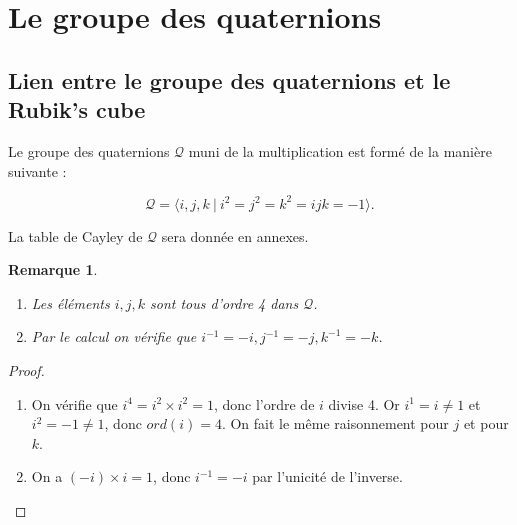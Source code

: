 \documentclass[french]{report}
\newtheorem*{remark}{Remarque}
\begin{document}








\section{Le groupe des quaternions}

\subsection{Lien entre le groupe des quaternions et le Rubik's cube}

Le groupe des quaternions $\mathcal{Q}$ muni de la multiplication est formé de la manière suivante :

$$ \mathcal{Q} = \langle i,j,k \ | \ i ^2 = j ^2 = k ^2 = ijk = -1 \rangle  .$$

La table de Cayley de $\mathcal{Q}$ sera donnée en annexes.

\begin{remark}
  \

  \begin{enumerate}
    \item Les éléments $i,j,k$ sont tous d'ordre 4 dans $\mathcal{Q}$.
    \item Par le calcul on vérifie que $i ^{-1} = -i, j ^{-1} = -j, k ^{-1} = -k$.
  \end{enumerate}
\end{remark}

\begin{proof}
\

\begin{enumerate}
  \item   On vérifie que $i ^{4} = i ^2 \times i ^2 = 1$, donc l'ordre de $i$ divise 4. Or $i ^{1} = i \neq 1$ et $i ^{2} =  -1 \neq 1$, donc $ord( i ) =4$. On fait le même raisonnement pour $j$ et pour $k$.
  \item On a $(-i) \times i =1$, donc $i ^{-1} =-i$ par l'unicité de l'inverse.
\end{enumerate}
\end{proof}
\end{document}
